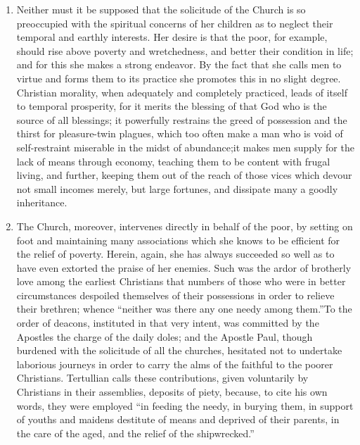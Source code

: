 \documentclass{book}
\begin{document}
\begin{enumerate}
	\item Neither must it be supposed that the solicitude of the Church is so preoccupied with the spiritual concerns of her children as to neglect their temporal and earthly interests. Her desire is that the poor, for example, should rise above poverty and wretchedness, and better their condition in life; and for this she makes a strong endeavor. By the fact that she calls men to virtue and forms them to its practice she promotes this in no slight degree. Christian morality, when adequately and completely practiced, leads of itself to temporal prosperity, for it merits the blessing of that God who is the source of all blessings; it powerfully restrains the greed of possession and the thirst for pleasure-twin plagues, which too often make a man who is void of self-restraint miserable in the midst of abundance;\footnotemark[22] it makes men supply for the lack of means through economy, teaching them to be content with frugal living, and further, keeping them out of the reach of those vices which devour not small incomes merely, but large fortunes, and dissipate many a goodly inheritance.


	\item The Church, moreover, intervenes directly in behalf of the poor, by setting on foot and maintaining many associations which she knows to be efficient for the relief of poverty. Herein, again, she has always succeeded so well as to have even extorted the praise of her enemies. Such was the ardor of brotherly love among the earliest Christians that numbers of those who were in better circumstances despoiled themselves of their possessions in order to relieve their brethren; whence “neither was there any one needy among them.”\footnotemark[23] To the order of deacons, instituted in that very intent, was committed by the Apostles the charge of the daily doles; and the Apostle Paul, though burdened with the solicitude of all the churches, hesitated not to undertake laborious journeys in order to carry the alms of the faithful to the poorer Christians. Tertullian calls these contributions, given voluntarily by Christians in their assemblies, deposits of piety, because, to cite his own words, they were employed “in feeding the needy, in burying them, in support of youths and maidens destitute of means and deprived of their parents, in the care of the aged, and the relief of the shipwrecked.”\footnotemark[24]



\end{enumerate}
\end{document}
